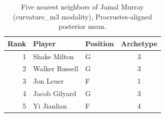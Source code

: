 \begin{table}[htbp]
  \centering\small
  \begin{tabular}{rllc}
    \toprule
    Rank & Player & Position & Archetype \\
    \midrule
    1 & Shake Milton & G & 3 \\
    2 & Walker Russell & G & 3 \\
    3 & Jon Leuer & F & 1 \\
    4 & Jacob Gilyard & G & 3 \\
    5 & Yi Jianlian & F & 4 \\
    \bottomrule
  \end{tabular}
  \caption{Five nearest neighbors of Jamal Murray (curvature_m3 modality), Procrustes-aligned posterior mean.}
  \label{tab:Jamal_Murray_neighbors_curvature_m3}
\end{table}

